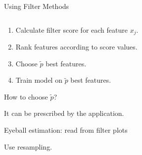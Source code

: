 \documentclass[11pt,compress,t,notes=noshow, xcolor=table]{beamer}
\begin{document}
\begin{vbframe}{Using Filter Methods}
  


  \begin{columns}
    \begin{column}{0.65\textwidth}
      \begin{enumerate}{}
        \setlength{\itemsep}{1.2em}
          \item Calculate filter score for each feature $x_j$.
          \item Rank features according to score values.
          \item Choose $\tilde{p}$ best features.
          \item Train model on $\tilde{p}$ best features.
        \end{enumerate}
      
        \lz
      
        \begin{blocki}{How to choose $\tilde{p}$?}
          \item It can be prescribed by the application.
          \item Eyeball estimation: read from filter plots
          \item Use resampling.
        \end{blocki}
    \end{column}


\end{columns}
\end{vbframe}
\end{document}
